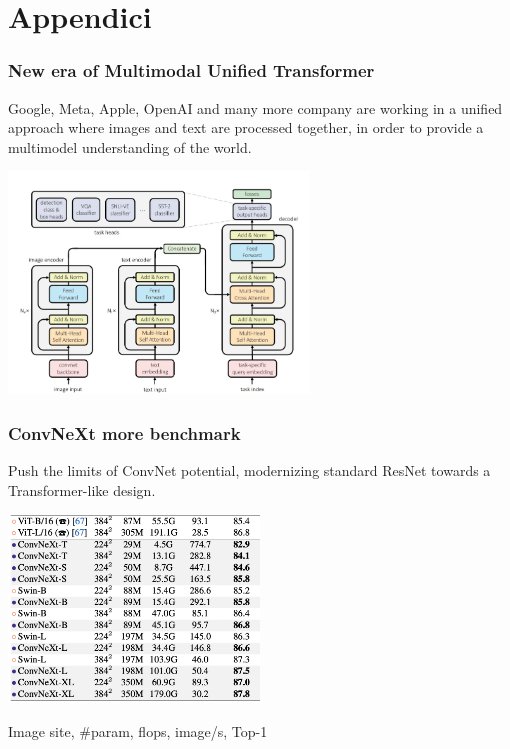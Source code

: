 \section{Appendici}

\begin{frame}
\frametitle{New era of Multimodal Unified Transformer}  
Google, Meta, Apple, OpenAI and many more company are working in a unified approach where images and text are processed together,
in order to provide a multimodel understanding of the world.
\begin{center}
    \includegraphics[width=0.6\textwidth]{img/4-section/Multimodel.png}
\end{center}

\end{frame}


\begin{frame}
\frametitle{ConvNeXt more benchmark}
Push the limits of ConvNet potential, modernizing  standard ResNet towards a Transformer-like design.

\begin{center}
    \includegraphics[width=0.5\textwidth]{img/4-section/ConvNext2.png}
\end{center}

Image site, \#param, flops, image/s, Top-1

\end{frame}



